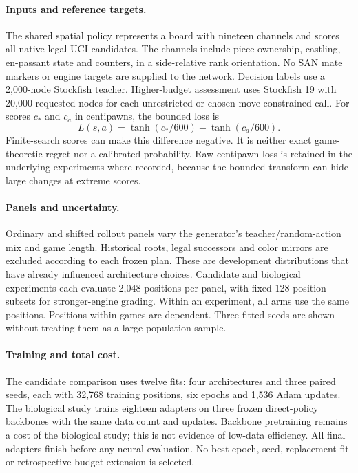 \documentclass{article}
\begin{document}
\paragraph{Inputs and reference targets.}
The shared spatial policy represents a board with nineteen channels and scores
all native legal UCI candidates. The channels include piece ownership, castling,
en-passant state and counters, in a side-relative rank orientation. No SAN mate
markers or engine targets are supplied to the network. Decision labels use a
2,000-node Stockfish teacher. Higher-budget assessment uses Stockfish 19 with
20,000 requested nodes for each unrestricted or chosen-move-constrained call.
For scores $c_*$ and $c_a$ in centipawns, the bounded loss is
\begin{equation}
 L(s,a)=\tanh(c_*/600)-\tanh(c_a/600).
\end{equation}
Finite-search scores can make this difference negative. It is neither exact
game-theoretic regret nor a calibrated probability. Raw centipawn loss is retained
in the underlying experiments where recorded, because the bounded transform can
hide large changes at extreme scores.

\paragraph{Panels and uncertainty.}
Ordinary and shifted rollout panels vary the generator's teacher/random-action
mix and game length. Historical roots, legal successors and color mirrors are
excluded according to each frozen plan. These are development distributions
that have already influenced architecture choices. Candidate and biological
experiments each evaluate 2,048 positions per panel, with fixed 128-position
subsets for stronger-engine grading. Within an experiment, all arms use the same
positions. Positions within games are dependent. Three fitted seeds are shown
without treating them as a large population sample.

\paragraph{Training and total cost.}
The candidate comparison uses twelve fits: four architectures and three paired
seeds, each with 32,768 training positions, six epochs and 1,536 Adam updates.
The biological study trains eighteen adapters on three frozen direct-policy
backbones with the same data count and updates. Backbone pretraining remains a
cost of the biological study; this is not evidence of low-data efficiency.
All final adapters finish before any neural evaluation. No best epoch, seed,
replacement fit or retrospective budget extension is selected.
\end{document}
